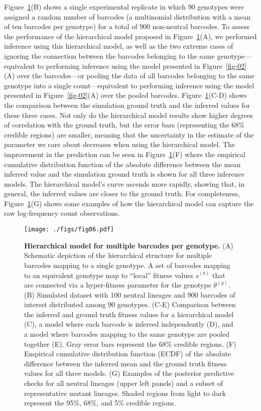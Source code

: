 \documentclass[
]{scrartcl}
\begin{document}
\begin{refsegment}
Figure~\ref{fig-06}(B) shows a single experimental replicate in which 90
genotypes were assigned a random number of barcodes (a multinomial
distribution with a mean of ten barcodes per genotype) for a total of
900 non-neutral barcodes. To assess the performance of the hierarchical
model proposed in Figure~\ref{fig-06}(A), we performed inference using
this hierarchical model, as well as the two extreme cases of ignoring
the connection between the barcodes belonging to the same
genotype---equivalent to performing inference using the model presented
in Figure~\ref{fig-02}(A) over the barcodes---or pooling the data of all
barcodes belonging to the same genotype into a single count---equivalent
to performing inference using the model presented in
Figure~\ref{fig-02}(A) over the pooled barcodes.
Figure~\ref{fig-06}(C-D) shows the comparison between the simulation
ground truth and the inferred values for these three cases. Not only do
the hierarchical model results show higher degrees of correlation with
the ground truth, but the error bars (representing the 68\% credible
regions) are smaller, meaning that the uncertainty in the estimate of
the parameter we care about decreases when using the hierarchical model.
The improvement in the prediction can be seen in Figure~\ref{fig-06}(F)
where the empirical cumulative distribution function of the absolute
difference between the mean inferred value and the simulation ground
truth is shown for all three inference models. The hierarchical model's
curve ascends more rapidly, showing that, in general, the inferred
values are closer to the ground truth. For completeness,
Figure~\ref{fig-06}(G) shows some examples of how the hierarchical model
can capture the raw log-frequency count observations.

\begin{figure}

{\centering \texttt{[image: ./figs/fig06.pdf]}

}

\caption{\label{fig-06}\textbf{Hierarchical model for multiple barcodes
per genotype.} (A) Schematic depiction of the hierarchical structure for
multiple barcodes mapping to a single genotype. A set of barcodes
mapping to an equivalent genotype map to ``local'' fitness values
\(s^{(b)}\) that are connected via a hyper-fitness parameter for the
genotype \(\theta^{(g)}\). (B) Simulated dataset with 100 neutral
lineages and 900 barcodes of interest distributed among 90 genotypes.
(C-E) Comparison between the inferred and ground truth fitness values
for a hierarchical model (C), a model where each barcode is inferred
independently (D), and a model where barcodes mapping to the same
genotype are pooled together (E). Gray error bars represent the 68\%
credible regions. (F) Empirical cumulative distribution function (ECDF)
of the absolute difference between the inferred mean and the ground
truth fitness values for all three models. (G) Examples of the posterior
predictive checks for all neutral lineages (upper left panels) and a
subset of representative mutant lineages. Shaded regions from light to
dark represent the 95\%, 68\%, and 5\% credible regions.}


\end{figure}
\end{refsegment}
\end{document}
